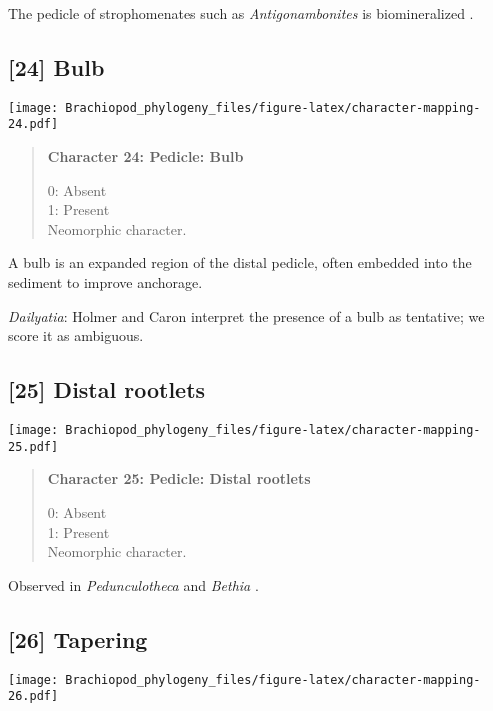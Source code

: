 \documentclass[openany]{book}
\theoremstyle{definition}
\theoremstyle{definition}
\theoremstyle{definition}
\theoremstyle{remark}
\begin{document}
The pedicle of strophomenates such as \emph{Antigonambonites} is
biomineralized \citep{Holmer2018Evolutionarysignificance}.

\subsection*{{[}24{]} Bulb}\label{bulb}

\texttt{[image: Brachiopod\_phylogeny\_files/figure-latex/character-mapping-24.pdf]}

\begin{quote}
\textbf{Character 24: Pedicle: Bulb}

0: Absent\\
1: Present\\
Neomorphic character.
\end{quote}

A bulb is an expanded region of the distal pedicle, often embedded into
the sediment to improve anchorage.

\hypertarget{Dailyatia-coding-24}{}
\emph{Dailyatia}: Holmer and Caron \citeyearpar{Holmer2006Aspinose}
interpret the presence of a bulb as tentative; we score it as ambiguous.

\subsection*{{[}25{]} Distal rootlets}\label{distal-rootlets}

\texttt{[image: Brachiopod\_phylogeny\_files/figure-latex/character-mapping-25.pdf]}

\begin{quote}
\textbf{Character 25: Pedicle: Distal rootlets}

0: Absent\\
1: Present\\
Neomorphic character.
\end{quote}

Observed in \emph{Pedunculotheca} and \emph{Bethia}
\citep{Sutton2005Silurianbrachiopods}.

\subsection*{{[}26{]} Tapering}\label{tapering}

\texttt{[image: Brachiopod\_phylogeny\_files/figure-latex/character-mapping-26.pdf]}
\end{document}
